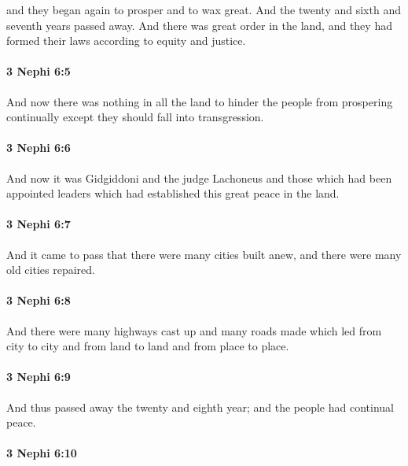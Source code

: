 			and they began again to prosper and to wax great.
			And the twenty and sixth and seventh years passed away.
			And there was great order in the land,
			and they had formed their laws according to equity and justice.

		\paragraph{3 Nephi 6:5} %
			\label{3NEPHI-6-5}

			And now there was nothing in all the land
			to hinder the people from prospering continually
			except they should fall into transgression.

		\paragraph{3 Nephi 6:6} %
			\label{3NEPHI-6-6}

			And now it was Gidgiddoni and the judge Lachoneus
			and those which had been appointed leaders
			which had established this great peace in the land.

		\paragraph{3 Nephi 6:7} %
			\label{3NEPHI-6-7}

			And it came to pass that there were many cities built anew,
			and there were many old cities repaired.

		\paragraph{3 Nephi 6:8} %
			\label{3NEPHI-6-8}

			And there were many highways cast up
			and many roads made which led from city to city
			and from land to land and from place to place.

		\paragraph{3 Nephi 6:9} %
			\label{3NEPHI-6-9}

			And thus passed away the twenty and eighth year;
			and the people had continual peace.

		\paragraph{3 Nephi 6:10} %
			\label{3NEPHI-6-10}

